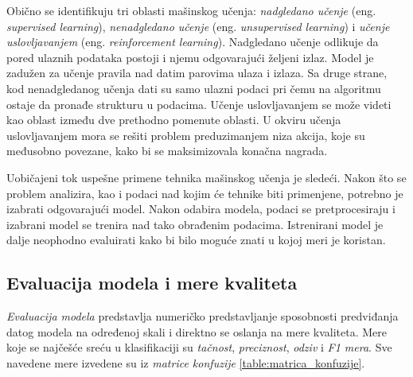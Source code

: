 \documentclass[a4paper]{article}
\theoremstyle{definition}
\begin{document}
{\par Obično se identifikuju tri oblasti mašinskog učenja: \textit{nadgledano učenje} (eng. \emph{supervised learning}), \textit{nenadgledano učenje} (eng. \emph{unsupervised learning}) i \textit{učenje uslovljavanjem} (eng. \emph{reinforcement learning}). Nadgledano učenje odlikuje da pored ulaznih podataka postoji i njemu odgovarajući željeni izlaz. Model je zadužen za učenje pravila nad datim parovima ulaza i izlaza. Sa druge strane, kod nenadgledanog učenja dati su samo ulazni podaci pri čemu na algoritmu ostaje da pronađe strukturu u podacima. 
Učenje uslovljavanjem se može videti kao oblast između dve pret\-hod\-no pomenute oblasti. U okviru učenja uslovljavanjem mora se rešiti problem preduzimanjem niza akcija, koje su međusobno povezane, kako bi se maksimizovala konačna nagrada.

\par Uobičajeni tok uspešne primene tehnika mašinskog učenja je sledeći. Nakon što se problem analizira, kao i podaci nad kojim će tehnike biti primenjene, potrebno je izabrati odgovarajući model. Nakon odabira modela, podaci se pretprocesiraju i izabrani model se trenira nad tako obrađenim podacima. Istrenirani model je dalje neophodno evaluirati kako bi bilo moguće znati u kojoj meri je koristan.




\subsection{Evaluacija modela i mere kvaliteta}


\par \textit{Evaluacija modela} predstavlja numeričko predstavljanje sposobnosti predviđanja datog modela na određenoj skali i direktno se oslanja na mere kvaliteta. Mere koje se najčešće sreću u klasifikaciji su \textit{tačnost}, \textit{preciznost}, \textit{odziv} i \textit{F1 mera}. Sve navedene mere izvedene su iz \textit{matrice konfuzije} \ref{table:matrica_konfuzije}.

}
\end{document}
